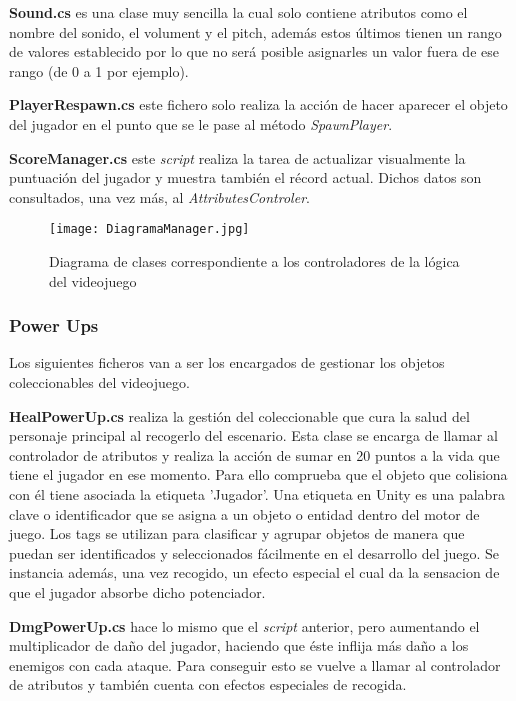 \textbf{Sound.cs} es una clase muy sencilla la cual solo contiene atributos como el nombre del sonido, el volument y el pitch, además estos últimos tienen un rango de valores establecido por lo que no será posible asignarles un valor fuera de ese rango (de 0 a 1 por ejemplo).

\textbf{PlayerRespawn.cs} este fichero solo realiza la acción de hacer aparecer el objeto del jugador en el punto que se le pase al método \textit{SpawnPlayer}.

\textbf{ScoreManager.cs} este \textit{script} realiza la tarea de actualizar visualmente la puntuación del jugador y muestra también el récord actual. Dichos datos son consultados, una vez más, al \textit{AttributesControler}.

\begin{figure}[H]
    \centering
    \texttt{[image: DiagramaManager.jpg]}
    \caption{Diagrama de clases correspondiente a los controladores de la lógica del videojuego}
\end{figure}

\subsubsection{Power Ups}

Los siguientes ficheros van a ser los encargados de gestionar los objetos coleccionables del videojuego.

\textbf{HealPowerUp.cs} realiza la gestión del coleccionable que cura la salud del personaje principal al recogerlo del escenario. Esta clase se encarga de llamar al controlador de atributos y realiza la acción de sumar en 20 puntos a la vida que tiene el jugador en ese momento. Para ello comprueba que el objeto que colisiona con él tiene asociada la etiqueta 'Jugador'. Una etiqueta en Unity es una palabra clave o identificador que se asigna a un objeto o entidad dentro del motor de juego. Los tags se utilizan para clasificar y agrupar objetos de manera que puedan ser identificados y seleccionados fácilmente en el desarrollo del juego. Se instancia además, una vez recogido, un efecto especial el cual da la sensacion de que el jugador absorbe dicho potenciador.

\textbf{DmgPowerUp.cs} hace lo mismo que el \textit{script} anterior, pero aumentando el multiplicador de daño del jugador, haciendo que éste inflija más daño a los enemigos con cada ataque. Para conseguir esto se vuelve a llamar al controlador de atributos y también cuenta con efectos especiales de recogida.

